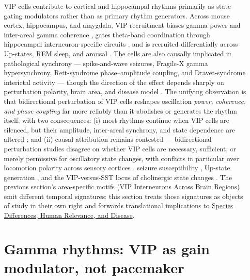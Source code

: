 \documentclass[11pt]{article}
\begin{document}
VIP cells contribute to cortical and hippocampal rhythms primarily as state-gating modulators rather than as primary rhythm generators. Across mouse cortex, hippocampus, and amygdala, VIP recruitment biases gamma power and inter-areal gamma coherence \citep{Veit2023, Wagatsuma2023, Knoblich2019}, gates theta-band coordination through hippocampal interneuron-specific circuits \citep{Tyan2014, Luo2020, Lee2019}, and is recruited differentially across Up-states, REM sleep, and arousal \citep{Tahvildari2012, Brecier2022, Rolle2025, Sabri2024}. The cells are also causally implicated in pathological synchrony --- spike-and-wave seizures, Fragile-X gamma hypersynchrony, Rett-syndrome phase--amplitude coupling, and Dravet-syndrome interictal activity --- though the direction of the effect depends sharply on perturbation polarity, brain area, and disease model \citep{Hall2015, Goel2025, Kranz2025, Goff2019}. The unifying observation is that bidirectional perturbation of VIP cells reshapes oscillation \textit{power, coherence, and phase coupling} far more reliably than it abolishes or generates the rhythm itself, with two consequences: (i) most rhythms continue when VIP cells are silenced, but their amplitude, inter-areal synchrony, and state dependence are altered \citep{Veit2023, Bastos2023a, Sabri2024, Lee2025}; and (ii) causal attribution remains contested --- bidirectional perturbation studies disagree on whether VIP cells are necessary, sufficient, or merely permissive for oscillatory state changes, with conflicts in particular over locomotion polarity across sensory cortices \citep{Fu2014, Pakan2016}, seizure susceptibility \citep{Hall2015}, Up-state generation \citep{Tahvildari2012, Kawaguchi2001}, and the VIP-versus-SST locus of cholinergic state changes \citep{Chen2015a, Szadai2022, Kuchibhotla2017}. The previous section's area-specific motifs (\href{/cross-areas}{VIP Interneurons Across Brain Regions}) emit different temporal signatures; this section treats those signatures as objects of study in their own right and forwards translational implications to \href{/disease-translational}{Species Differences, Human Relevance, and Disease}.

\section{Gamma rhythms: VIP as gain modulator, not pacemaker}
\end{document}
